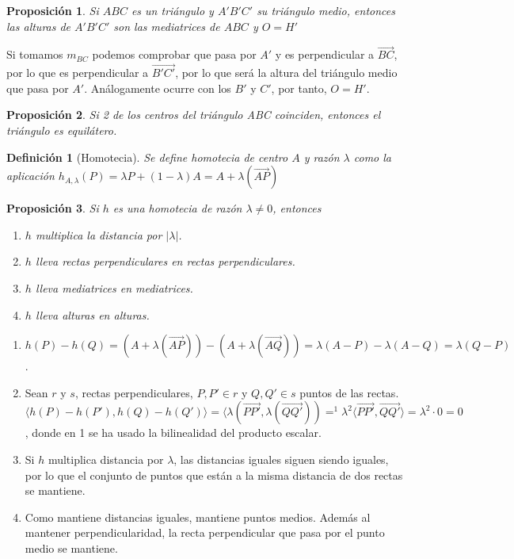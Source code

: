 \documentclass[11pt, a4paper]{article}
\makeatletter
\newif\IfInSansMode
\let\oldsf\sffamily
\renewcommand*{\sffamily}{\oldsf\mathversion{sans}\InSansModetrue}
\let\oldnorm\normalfont
\renewcommand*{\normalfont}{\oldnorm\InSansModefalse\mathversion{normal}}
\renewenvironment{proof}[1][\proofname] {\vspace{-15pt}\par\pushQED{\qed}\normalfont\topsep6\p@\@plus6\p@\relax\trivlist\item[\hskip\labelsep\it#1\@addpunct{.}]\ignorespaces}{\popQED\endtrivlist\@endpefalse}
\renewcommand{\vec}{\overrightarrow}
\renewenvironment{proof}[1][\proofname] {\par\pushQED{\qed}\normalfont\topsep6\p@\@plus6\p@\relax\trivlist\item[\hskip\labelsep\itshape\sffamily#1\@addpunct{.}]\ignorespaces}{\popQED\endtrivlist\@endpefalse}
\theoremstyle{theorem-style}
\newtheorem{nprop}{Proposición}[section]
\theoremstyle{definition-style}
\newtheorem{ndef}{Definición}[section]
\theoremstyle{remark-style}
\theoremstyle{example-style}
\makeatother
\begin{document}
\begin{nprop}
  Si $ABC$ es un triángulo y $A'B'C'$ su triángulo medio, entonces las alturas de $A'B'C'$ son las mediatrices de $ABC$ y $O=H'$
\end{nprop}
\begin{proof}
  Si tomamos $m_{BC}$ podemos comprobar que pasa por $A'$ y es perpendicular a $\vec{BC}$, por lo que es perpendicular a $\vec{B'C'}$, por lo que será la altura del triángulo medio que pasa por $A'$. Análogamente ocurre con los $B'$ y $C'$, por tanto, $O=H'$.
\end{proof}


\begin{nprop}Si 2 de los centros del triángulo ABC coinciden, entonces el triángulo es equilátero.
\end{nprop}


\begin{ndef}[Homotecia]
  Se define homotecia de centro $A$ y razón $\lambda$ como la aplicación $h_{A,\lambda}(P) = \lambda P + (1-\lambda)A = A+\lambda(\vec{AP})$
\end{ndef}

\begin{nprop} Si $h$ es una homotecia de razón $\lambda\ne 0$, entonces 
\begin{enumerate}
\item $h$ multiplica la distancia por $|\lambda|$.
\item $h$ lleva rectas perpendiculares en rectas perpendiculares.
\item $h$ lleva mediatrices en mediatrices.
\item $h$ lleva alturas en alturas.
\end{enumerate}
\end{nprop}

\begin{proof}\hfill
\begin{enumerate}
	\item $h(P)-h(Q)=(A+\lambda(\vec{AP})) -(A+\lambda(\vec{AQ})) = \lambda(A-P) - \lambda(A-Q) = \lambda (Q-P)$.
	\item  Sean $r$ y $ s$, rectas perpendiculares, $P,P' \in r$ y $Q,Q'\in s$ puntos de las rectas. $\langle h(P) - h(P'),h(Q) - h(Q')\rangle  =  \langle \lambda (\vec{PP'}, \lambda(\vec {QQ'}))=^1 \lambda^2 \langle \vec{PP'},\vec{QQ'}\rangle  = \lambda^2 \cdot 0 = 0 $, donde en 1 se ha usado la bilinealidad del producto escalar.
	\item Si $h$ multiplica distancia por $\lambda$, las distancias iguales siguen siendo iguales, por lo que el conjunto de puntos que están a la misma distancia de dos rectas se mantiene.
	\item Como mantiene distancias iguales, mantiene puntos medios. Además al mantener perpendicularidad, la recta perpendicular que pasa por el punto medio se mantiene.
\end{enumerate}
\end{proof}
\end{document}
